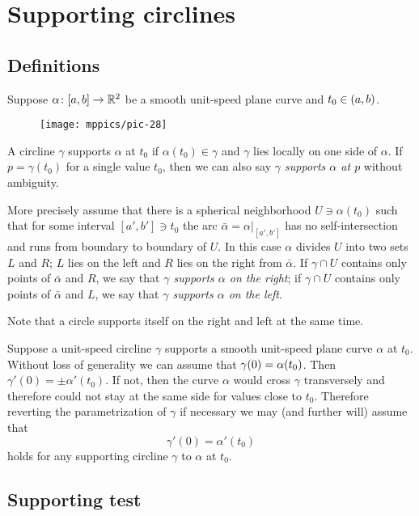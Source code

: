 \chapter{Supporting circlines}

\section{Definitions}

Suppose $\alpha\colon[a,b]\to\mathbb{R}^2$ be a smooth unit-speed plane curve and $t_0\z\in(a,b)$.

\begin{wrapfigure}{r}{43 mm}
\vskip-4mm
\centering
\texttt{[image: mppics/pic-28]}
\vskip0mm
\end{wrapfigure}

A circline $\gamma$ supports $\alpha$ at $t_0$ if $\alpha(t_0)\in\gamma$
and $\gamma$ lies locally on one side of $\alpha$.
If $p=\gamma(t_0)$ for a single value $t_0$,
then we can also say \emph{$\gamma$ supports $\alpha$ at $p$} without ambiguity.

More precisely assume that there is a spherical neighborhood $U\ni \alpha(t_0)$ such that for some interval $[a',b']\ni t_0$
the arc $\bar\alpha=\alpha|_{[a',b']}$ has no self-intersection and runs from boundary to boundary of $U$.
In this case $\alpha$ divides $U$ into two sets  $L$ and $R$;
$L$ lies on the left and $R$ lies on the right from $\bar\alpha$.
If $\gamma\cap U$ contains only points of $\bar\alpha$ and $R$, we say that \emph{$\gamma$ supports $\alpha$ on the right};
if $\gamma\cap U$ contains only points of $\bar\alpha$ and $L$, we say that \emph{$\gamma$ supports $\alpha$ on the left}.



Note that a circle supports itself on the right and left at the same time.

Suppose a unit-speed circline $\gamma$ supports a smooth unit-speed plane curve $\alpha$ at $t_0$.
Without loss of generality we can assume that $\gamma(0)\z=\alpha(t_0)$. 
Then $\gamma'(0)=\pm\alpha'(t_0)$.
If not, then the curve $\alpha$ would cross $\gamma$ transversely and therefore could not stay at the same side for values close to $t_0$.
Therefore reverting the parametrization of $\gamma$ if necessary we may (and further will) assume that 
\[\gamma'(0)=\alpha'(t_0)\]
holds for any supporting circline $\gamma$ to $\alpha$ at $t_0$.

\section{Supporting test}

